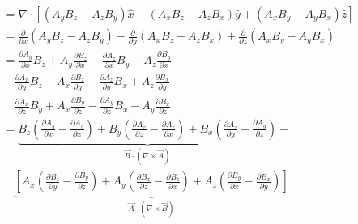 \documentclass[12pt]{article}
\begin{document}
\begin{enumerate}
\begin{align*}
		                                            & = \nabla \cdot [(A_y B_z - A_z B_y) \hat{x} - (A_x B_z - A_z B_x) \hat{y} + (A_x B_y - A_y B_x) \hat{z}]                                                                                                                                                                                                                           \\
		                                            & = \frac{\partial}{\partial x} (A_y B_z - A_z B_y) - \frac{\partial}{\partial y} (A_x B_z - A_z B_x) + \frac{\partial}{\partial z} (A_x B_y - A_y B_x)                                                                                                                                                                              \\
		                                            & = \frac{\partial A_y}{\partial x} B_z + A_y \frac{\partial B_z}{\partial x} - \frac{\partial A_z}{\partial x} B_y - A_z \frac{\partial B_y}{\partial x} -                                                                                                                                                                          \\
		                                            & \quad \frac{\partial A_x}{\partial y} B_z - A_x \frac{\partial B_z}{\partial y} + \frac{\partial A_z}{\partial y} B_x + A_z \frac{\partial B_x}{\partial y} +                                                                                                                                                                      \\
		                                            & \quad\frac{\partial A_x}{\partial z} B_y + A_x \frac{\partial B_y}{\partial z} - \frac{\partial A_y}{\partial z} B_x - A_y \frac{\partial B_x}{\partial z}                                                                                                                                                                         \\
		                                            & = \underbrace{B_z \left(\frac{\partial A_y}{\partial x} - \frac{\partial A_y}{\partial x}\right) + B_y \left(\frac{\partial A_x}{\partial z} - \frac{\partial A_z}{\partial x}\right) + B_x \left(\frac{\partial A_z}{\partial y} - \frac{\partial A_y}{\partial z}\right)}_{\vec{B} \cdot (\nabla \times \vec{A})} -              \\
		                                            & \quad \underbrace{\left[A_x \left(\frac{\partial B_z}{\partial y} - \frac{\partial B_y}{\partial z}\right) + A_y \left(\frac{\partial B_x}{\partial z} - \frac{\partial B_z}{\partial x}\right) + A_z \left(\frac{\partial B_y}{\partial x} - \frac{\partial B_x}{\partial y}\right)\right]}_{\vec{A}\cdot(\nabla \times \vec{B})} \\

\end{align*}
\end{enumerate}
\end{document}
